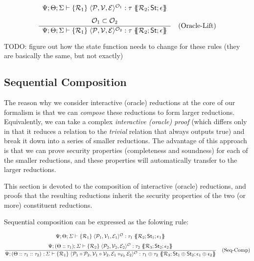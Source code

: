 \[
\frac{%
  \begin{array}{c}
    \Psi; \Theta; \Sigma \vdash \{\mathcal{R}_1\} \; \langle\mathcal{P}, \mathcal{V}, \mathcal{E}\rangle^{\mathcal{O}_1} : \tau \; \{\!\!\{\mathcal{R}_2; \mathsf{St}; \epsilon\}\!\!\} \\[1.5ex]
    \mathcal{O}_1 \subset \mathcal{O}_2
  \end{array}%
}{%
  \Psi; \Theta; \Sigma \vdash \{\mathcal{R}_1\} \; \langle\mathcal{P}, \mathcal{V}, \mathcal{E}\rangle^{\mathcal{O}_2} : \tau \; \{\!\!\{\mathcal{R}_2; \mathsf{St}; \epsilon\}\!\!\}
} \quad \text{(Oracle-Lift)}
\]

TODO: figure out how the state function needs to change for these rules (they are basically the same, but not exactly)

\subsection{Sequential Composition}

The reason why we consider interactive (oracle) reductions at the core of our formalism is that we
can \emph{compose} these reductions to form larger reductions. Equivalently, we can take a complex
\emph{interactive (oracle) proof} (which differs only in that it reduces a relation to the
\emph{trivial} relation that always outputs true) and break it down into a series of smaller
reductions. The advantage of this approach is that we can prove security properties (completeness
and soundness) for each of the smaller reductions, and these properties will automatically transfer
to the larger reductions.

This section is devoted to the composition of interactive (oracle) reductions, and proofs that the
resulting reductions inherit the security properties of the two (or more) constituent reductions.

Sequential composition can be expressed as the folowing rule:

\[
\frac{%
  \begin{array}{c}
    \Psi; \Theta; \varSigma \vdash \{\mathcal{R}_1\} \; \langle\mathcal{P}_1, \mathcal{V}_1, \mathcal{E}_1\rangle^{\mathcal{O}} : \tau_1 \; \{\!\!\{\mathcal{R}_2; \mathsf{St}_1; \epsilon_1\}\!\!\} \\[1.5ex]
    \Psi; (\Theta :: \tau_1) ; \varSigma \vdash \{\mathcal{R}_2\} \; \langle\mathcal{P}_2, \mathcal{V}_2, \mathcal{E}_2\rangle^{\mathcal{O}} : \tau_2 \; \{\!\!\{\mathcal{R}_3; \mathsf{St}_2; \epsilon_2\}\!\!\}
  \end{array}%
}{%
  \Psi; (\Theta :: \tau_1 :: \tau_2) \ ; \varSigma \vdash \{\mathcal{R}_1\} \; \langle\mathcal{P}_1 \circ \mathcal{P}_2, \mathcal{V}_1 \circ \mathcal{V}_2, \mathcal{E}_1 \circ_{\mathcal{V}_2} \mathcal{E}_2\rangle^{\mathcal{O}} : \tau_1 \oplus \tau_2 \; \{\!\!\{\mathcal{R}_3; \mathsf{St}_1 \oplus \mathsf{St}_2; \epsilon_1 \oplus \epsilon_2\}\!\!\}
} \quad \text{(Seq-Comp)}
\]


